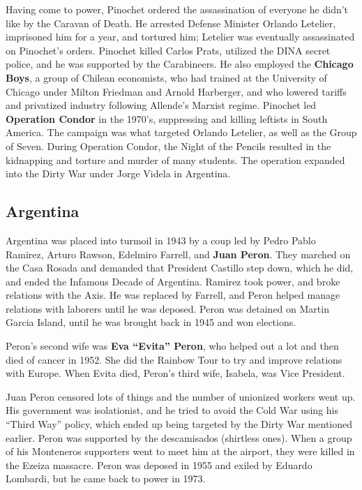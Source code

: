 Having come to power, Pinochet ordered the assassination of everyone he didn't like by the Caravan of Death.
He arrested Defense Minister Orlando Letelier, imprisoned him for a year, and tortured him;
Letelier was eventually assassinated on Pinochet's orders.
Pinochet killed Carlos Prats, utilized the DINA secret police, and he was supported by the Carabineers.
He also employed the \textbf{Chicago Boys}, a group of Chilean economists,
who had trained at the University of Chicago under Milton Friedman and Arnold Harberger,
and who lowered tariffs and privatized industry following Allende's Marxist regime.
Pinochet led \textbf{Operation Condor} in the 1970's, suppressing and killing leftists in South America.
The campaign was what targeted Orlando Letelier, as well as the Group of Seven.
During Operation Condor, the Night of the Pencils resulted in the kidnapping and torture and murder of many students.
The operation expanded into the Dirty War under Jorge Videla in Argentina.

\subsection*{Argentina}

Argentina was placed into turmoil in 1943 by a coup led by Pedro Pablo Ramirez, Arturo Rawson, Edelmiro Farrell,
and \textbf{Juan Peron}.
They marched on the Casa Rosada and demanded that President Castillo step down,
which he did, and ended the Infamous Decade of Argentina.
Ramirez took power, and broke relations with the Axis.
He was replaced by Farrell, and Peron helped manage relations with laborers until he was deposed.
Peron was detained on Martin Garcia Island, until he was brought back in 1945 and won elections.

Peron's second wife was \textbf{Eva ``Evita'' Peron}, who helped out a lot and then died of cancer in 1952.
She did the Rainbow Tour to try and improve relations with Europe.
When Evita died, Peron's third wife, Isabela, was Vice President.

Juan Peron censored lots of things and the number of unionized workers went up.
His government was isolationist, and he tried to avoid the Cold War using his ``Third Way'' policy,
which ended up being targeted by the Dirty War mentioned earlier.
Peron was supported by the descamisados (shirtless ones).
When a group of his Monteneros supporters went to meet him at the airport,
they were killed in the Ezeiza massacre.
Peron was deposed in 1955 and exiled by Eduardo Lombardi, but he came back to power in 1973.

